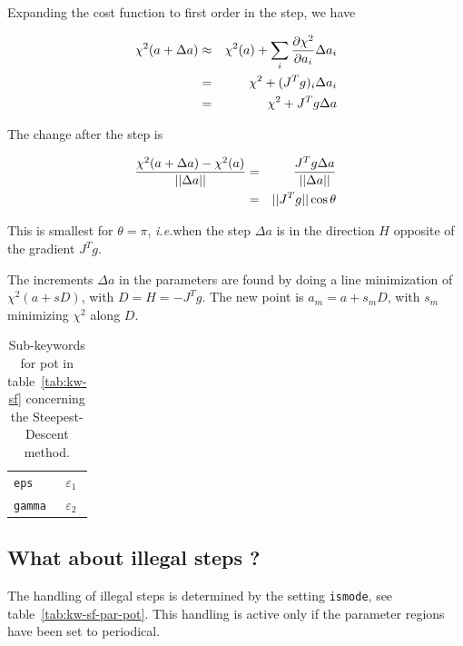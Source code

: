\documentclass[a4paper,12pt,onecolumn]{article}
\makeatletter
\newcommand{\ie}{\emph{i.e.\@\xspace}}
\def\eps{\varepsilon}
\makeatother
\begin{document}
Expanding the cost function to first order in the step, we have

\begin{eqnarray}
\chi^2(a + \Delta a)
&\approx &
\chi^2(a) + \sum_i {\partial \chi^2 \over \partial a_i} \Delta a_i \\
&=& \chi^2 + (J^T g)_i \Delta a_i \\
&=& \chi^2 + J^T g \Delta a
\label{eq:gradexp}
\end{eqnarray}

The change after the step is

\begin{eqnarray}
{\chi^2(a + \Delta a) - \chi^2(a) \over ||\Delta a||}
&=& {J^T g \Delta a \over ||\Delta a||} \\
&=& ||J^T g || \cos \theta
\end{eqnarray}

This is smallest for $\theta = \pi$, \ie when the step $\Delta a$
is in the direction $H$ opposite of the gradient $J^T g$.

The increments $\Delta a$ in the parameters are found by doing
a line minimization of $\chi^2(a + s D)$, with $D = H = - J^T g$.
The new point is $a_m = a + s_m D$, with $s_m$ minimizing $\chi^2$
along $D$.




\begin{table}[!h]
\caption{
Sub-keywords for \textrm{pot} in table~\ref{tab:kw-sf}
concerning the Steepest-Descent method.
\label{tab:kw-sd}
}
\begin{center}
\begin{tabular}{|l|l|}
\hline
\hline
\verb+eps+          & $\eps_1$ \\
\verb+gamma+        & $\eps_2$ \\
\hline
\hline
\end{tabular}
\end{center}
\end{table}















\subsection{What about illegal steps ?}

The handling of illegal steps is determined by the setting \verb+ismode+,
see table~\ref{tab:kw-sf-par-pot}. This handling is active only
if the parameter regions have been set to periodical.
\end{document}
